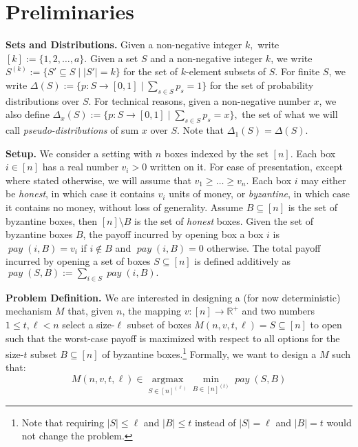 \documentclass[sigconf,nonacm]{aamas}
\DeclareMathOperator{\payText}{\textit{pay}}
\newcommand{\pay}[1]{\payText({#1})}
\begin{document}
\section{Preliminaries}\label{sect:prelims}

\textbf{Sets and Distributions.} Given a non-negative integer $k,$ write $[k] := \{1, 2, \dots, a\}.$
Given a set $S$ and a non-negative integer $k$, we write $S^{(k)} := \{S' \subseteq S \mid |S'| = k\}$ for the set of $k$-element subsets of $S$. 
For finite $S$, we write $\Delta(S) := \{p : S \to [0, 1] \mid \sum_{s \in S}p_s = 1\}$ for the set of probability distributions over $S$.
For technical reasons, given a non-negative number $x$, we also define $\Delta_x(S) := \{p : S \to [0, 1] \mid \sum_{s \in S}p_s = x\},$ the set of what we will call \emph{pseudo-distributions} of sum $x$ over $S$. Note that $\Delta_1(S) = \Delta(S).$

\textbf{Setup.} We consider a setting with $n$ boxes indexed by the set $[n].$ Each box $i \in [n]$ has a real number $v_i > 0$ written on it.
For ease of presentation, except where stated otherwise, we will assume that $v_1 \geq \dots \geq v_n$. Each box $i$ may either be \emph{honest}, in which case it contains $v_i$ units of money, or \emph{byzantine}, in which case it contains no money, without loss of generality. Assume $B \subseteq [n]$ is the set of byzantine boxes, then $[n] \setminus B$ is the set of \emph{honest} boxes. Given the set of byzantine boxes $B$, the payoff incurred by opening box a box $i$ is 
$\pay{i, B} = v_i$ if $i \notin B$ and $\pay{i, B} = 0$ otherwise. The total payoff incurred by opening a set of boxes $S \subseteq [n]$ is defined additively as $\pay{S, B} := \sum_{i \in S}\pay{i, B}.$ 

\textbf{Problem Definition.} We are interested in designing a (for now deterministic) mechanism $M$ that, given $n$, the mapping $v : [n] \to \mathbb{R}^+$ 
and two numbers $1 \leq t, \ell < n$ select a size-$\ell$ subset of boxes $M(n, v, t, \ell) = S \subseteq [n]$ to open such that the worst-case payoff is maximized with respect to all options for the size-$t$ subset $B \subseteq [n]$ of byzantine boxes.\footnote{Note that requiring $|S| \leq \ell$ and $|B| \leq t$ instead of $|S| = \ell$ and $|B| = t$ would not change the problem.} 
Formally, we want to design a $M$ such that:
%
\begin{equation}\label{eq:goal-deterministic}
    M(n, v, t, \ell) \in \operatorname*{argmax}_{S \in [n]^{(\ell)}} \min_{B \in [n]^{(t)}}\pay{S, B}
\end{equation}
\end{document}
